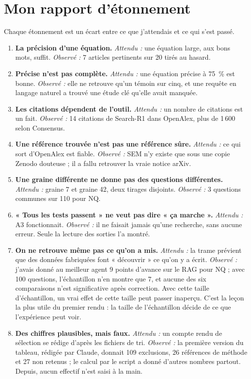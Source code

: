 \documentclass[10pt,a4paper]{article}
\begin{document}
\section{Mon rapport d'étonnement}

Chaque étonnement est un écart entre ce que j'attendais et ce qui s'est passé.

\begin{enumerate}
\item \textbf{La précision d'une équation.} \emph{Attendu :} une équation large, aux bons mots, suffit. \emph{Observé :} 7 articles pertinents sur 20 tirés au hasard.
\item \textbf{Précise n'est pas complète.} \emph{Attendu :} une équation précise à 75~\% est bonne. \emph{Observé :} elle ne retrouve qu'un témoin sur cinq, et une requête en langage naturel a trouvé une étude clé qu'elle avait manquée.
\item \textbf{Les citations dépendent de l'outil.} \emph{Attendu :} un nombre de citations est un fait. \emph{Observé :} 14 citations de Search-R1 dans OpenAlex, plus de 1\,600 selon Consensus.
\item \textbf{Une référence trouvée n'est pas une référence sûre.} \emph{Attendu :} ce qui sort d'OpenAlex est fiable. \emph{Observé :} SEM n'y existe que sous une copie Zenodo douteuse ; il a fallu retrouver la vraie notice arXiv.
\item \textbf{Une graine différente ne donne pas des questions différentes.} \emph{Attendu :} graine 7 et graine 42, deux tirages disjoints. \emph{Observé :} 3 questions communes sur 110 pour NQ.
\item \textbf{« Tous les tests passent » ne veut pas dire « ça marche ».} \emph{Attendu :} A3 fonctionnait. \emph{Observé :} il ne faisait jamais qu'une recherche, sans aucune erreur. Seule la lecture des sorties l'a montré.
\item \textbf{On ne retrouve même pas ce qu'on a mis.} \emph{Attendu :} la trame prévient que des données fabriquées font « découvrir » ce qu'on y a écrit. \emph{Observé :} j'avais donné au meilleur agent 9 points d'avance sur le RAG pour NQ ; avec 100 questions, l'échantillon n'en montre que 7, et aucune des six comparaisons n'est significative après correction. Avec cette taille d'échantillon, un vrai effet de cette taille peut passer inaperçu. C'est la leçon la plus utile du premier rendu : la taille de l'échantillon décide de ce que l'expérience peut voir.
\item \textbf{Des chiffres plausibles, mais faux.} \emph{Attendu :} un compte rendu de sélection se rédige d'après les fichiers de tri. \emph{Observé :} la première version du tableau, rédigée par Claude, donnait 109 exclusions, 26 références de méthode et 27 non retenus ; le calcul par le script a donné d'autres nombres partout. Depuis, aucun effectif n'est saisi à la main.

\end{enumerate}
\end{document}
